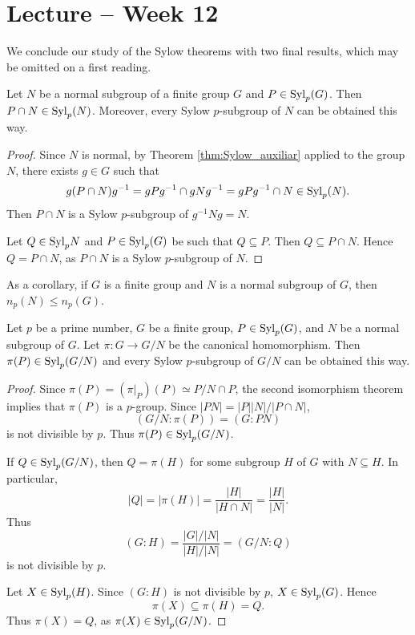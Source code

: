 \section{Lecture -- Week 12}

We conclude our study of the Sylow theorems with two final results, which may be omitted on a first reading.

\begin{optional}
\begin{theorem}
    Let $N$ be a normal subgroup of a finite group 
    $G$ and $P\in\mathrm{Syl}_p(G)$. Then 
    $P\cap N\in\mathrm{Syl}_p(N)$. Moreover, every Sylow 
    $p$-subgroup of $N$  
    can be obtained this way.
\end{theorem}

\begin{proof}
    Since $N$ is normal,
    by Theorem \ref{thm:Sylow_auxiliar} applied to the group $N$, 
    there exists 
    $g\in G$ such that 
        \[
                g(P\cap N)g^{-1}=gPg^{-1}\cap gNg^{-1}=gPg^{-1}\cap N\in\mathrm{Syl}_p(N).
        \]
    Then $P\cap N$ is a Sylow $p$-subgroup of $g^{-1}Ng=N$.

    Let $Q\in\mathrm{Syl}_pN$ and $P\in\mathrm{Syl}_p(G)$ be such that
    $Q\subseteq P$. Then
    $Q\subseteq P\cap N$. Hence 
    $Q=P\cap N$, as $P\cap N$ is a Sylow $p$-subgroup of $N$. 
\end{proof}
\end{optional}

As a corollary, if $G$ is a finite group and 
$N$ is a normal subgroup of $G$, then 
$n_p(N)\leq n_p(G)$.

\begin{optional}
\begin{theorem}
    Let $p$ be a prime number, $G$ be a finite group, $P\in\mathrm{Syl}_p(G)$, 
    and $N$ be a normal subgroup of $G$. Let $\pi\colon G\to G/N$ be the canonical homomorphism. Then 
    $\pi(P)\in\mathrm{Syl}_p(G/N)$ and every Sylow 
    $p$-subgroup of $G/N$ can be obtained this way. 
\end{theorem}

\begin{proof}
    Since $\pi(P)=(\pi|_{P})(P)\simeq P/N\cap P$,
    the second isomorphism theorem 
    implies that 
    $\pi(P)$ is a $p$-group. Since
    $|PN|=|P||N|/|P\cap N|$,
        \[
                (G/N:\pi(P))=(G:PN)
        \]
        is not divisible by $p$. Thus $\pi(P)\in\mathrm{Syl}_p(G/N)$.

        If $Q\in\mathrm{Syl}_p(G/N)$, then $Q=\pi(H)$ for some
        subgroup $H$ of $G$
        with $N\subseteq H$. In particular,
        \[
                |Q|=|\pi(H)|=\frac{|H|}{|H\cap N|}=\frac{|H|}{|N|}.
        \]
        Thus 
        \[
                (G:H)=\frac{|G|/|N|}{|H|/|N|}=(G/N:Q)
        \]
        is not divisible by $p$. 
        
        Let $X\in\mathrm{Syl}_p(H)$. Since $(G:H)$ is not divisible by $p$, 
        $X\in\mathrm{Syl}_p(G)$. Hence 
        \[
        \pi(X)\subseteq\pi(H)=Q. 
        \]
        Thus 
        $\pi(X)=Q$, as 
        $\pi(X)\in\mathrm{Syl}_p(G/N)$.
\end{proof}
\end{optional}

